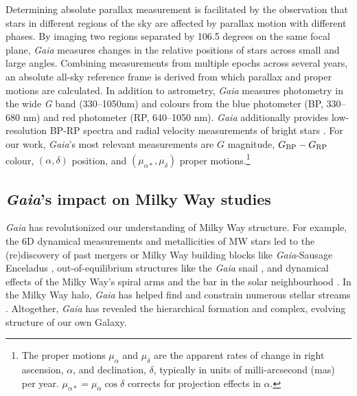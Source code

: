 Determining absolute parallax measurement is facilitated by the
observation that stars in different regions of the sky are affected by
parallax motion with different phases. By imaging two regions separated
by 106.5 degrees on the same focal plane, \emph{Gaia} measures changes
in the relative positions of stars across small and large angles.
Combining measurements from multiple epochs across several years, an
absolute all-sky reference frame is derived from which parallax and
proper motions are calculated. In addition to astrometry, \emph{Gaia}
measures photometry in the wide \emph{G} band (330--1050nm) and colours
from the blue photometer (BP, 330--680 nm) and red photometer (RP,
640--1050 nm). \emph{Gaia} additionally provides low-resolution BP-RP
spectra and radial velocity measurements of bright stars \citep[of
magnitudes \(G_{\rm RVS} < 16\),][]{gaiacollaboration+2016}. For our
work, \emph{Gaia}'s most relevant measurements are \(G\) magnitude,
\(G_{\rm BP} - G_{\rm RP}\) colour, \((\alpha, \delta)\) position, and
\((\mu_{\alpha*}, \mu_\delta)\) proper motions.\footnote{The proper
  motions \(\mu_\alpha\) and \(\mu_\delta\) are the apparent rates of
  change in right ascension, \(\alpha\), and declination, \(\delta\),
  typically in units of milli-arcsecond (mas) per year.
  \(\mu_{\alpha*} = \mu_\alpha \cos \delta\) corrects for projection
  effects in \(\alpha\).}

\subsection{\texorpdfstring{\emph{Gaia}'s impact on Milky Way
studies}{Gaia's impact on Milky Way studies}}\label{gaias-impact-on-milky-way-studies}

\emph{Gaia} has revolutionized our understanding of Milky Way structure.
For example, the 6D dynamical measurements and metallicities of MW stars
led to the (re)discovery of past mergers or Milky Way building blocks
like \emph{Gaia}-Sausage Enceladus
\citetext{\citealp[e.g.,][]{helmi+2018}; \citealp{belokurov+2018}; \citealp[but
see also][]{meza+2005}}, out-of-equilibrium structures like the
\emph{Gaia} snail \citep[e.g.,][]{antoja+2018}, and dynamical effects of
the Milky Way's spiral arms and the bar in the solar neighbourhood
\citep[ and references therein]{hunt+vasiliev2025}. In the Milky Way
halo, \emph{Gaia} has helped find and constrain numerous stellar streams
\citep{ibata+malhan+martin2019, bonaca+price-whelan2025}. Altogether,
\emph{Gaia} has revealed the hierarchical formation and complex,
evolving structure of our own Galaxy.

